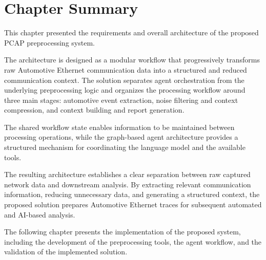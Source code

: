 \section{Chapter Summary}

This chapter presented the requirements and overall architecture of the proposed PCAP preprocessing system.

The architecture is designed as a modular workflow that progressively transforms raw Automotive Ethernet communication data into a structured and reduced communication context. The solution separates agent orchestration from the underlying preprocessing logic and organizes the processing workflow around three main stages: automotive event extraction, noise filtering and context compression, and context building and report generation.

The shared workflow state enables information to be maintained between processing operations, while the graph-based agent architecture provides a structured mechanism for coordinating the language model and the available tools.

The resulting architecture establishes a clear separation between raw captured network data and downstream analysis. By extracting relevant communication information, reducing unnecessary data, and generating a structured context, the proposed solution prepares Automotive Ethernet traces for subsequent automated and AI-based analysis.

The following chapter presents the implementation of the proposed system, including the development of the preprocessing tools, the agent workflow, and the validation of the implemented solution.